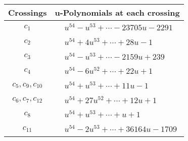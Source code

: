 \documentclass[1p]{elsarticle_modified}
\theoremstyle{definition}
\begin{document}
\begin{tabular}{m{50pt}|m{274pt}}
Crossings & \hspace{64pt}u-Polynomials at each crossing \\
\hline $$\begin{aligned}c_{1}\end{aligned}$$&$\begin{aligned}
&u^{54}- u^{53}+\cdots-23705 u-2291
\end{aligned}$\\
\hline $$\begin{aligned}c_{2}\end{aligned}$$&$\begin{aligned}
&u^{54}+4 u^{53}+\cdots+28 u-1
\end{aligned}$\\
\hline $$\begin{aligned}c_{3}\end{aligned}$$&$\begin{aligned}
&u^{54}- u^{53}+\cdots-2159 u+239
\end{aligned}$\\
\hline $$\begin{aligned}c_{4}\end{aligned}$$&$\begin{aligned}
&u^{54}-6 u^{52}+\cdots+22 u+1
\end{aligned}$\\
\hline $$\begin{aligned}c_{5},c_{9},c_{10}\end{aligned}$$&$\begin{aligned}
&u^{54}+u^{53}+\cdots+11 u-1
\end{aligned}$\\
\hline $$\begin{aligned}c_{6},c_{7},c_{12}\end{aligned}$$&$\begin{aligned}
&u^{54}+27 u^{52}+\cdots+12 u+1
\end{aligned}$\\
\hline $$\begin{aligned}c_{8}\end{aligned}$$&$\begin{aligned}
&u^{54}+u^{53}+\cdots+u+1
\end{aligned}$\\
\hline $$\begin{aligned}c_{11}\end{aligned}$$&$\begin{aligned}
&u^{54}-2 u^{53}+\cdots+36164 u-1709
\end{aligned}$\\
\hline
\end{tabular}\\~\\
\end{document}

